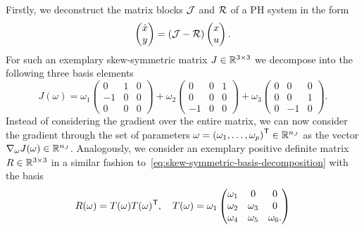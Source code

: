 Firstly, we deconstruct the matrix blocks $\mathcal{J}$ and $\mathcal{R}$ of a \ac{PH} system in the form
\begin{equation*}
    \begin{pmatrix}
        \dot{x} \\
        y
    \end{pmatrix} = (\mathcal{J} - \mathcal{R}) \begin{pmatrix}
        x \\
        u
    \end{pmatrix}.
\end{equation*}
For such an exemplary skew-symmetric matrix $J \in \mathbb{R}^{3 \times 3}$ we decompose into the following three basis elements
\begin{equation}\label{eq:skew-symmetric-basis-decomposition}
    J(\omega) = \omega_1 \begin{pmatrix}
        0 & 1 & 0 \\
        -1 & 0 & 0 \\
        0 & 0 & 0
    \end{pmatrix} + \omega_2 \begin{pmatrix}
        0 & 0 & 1 \\
        0 & 0 & 0 \\
        -1 & 0 & 0
    \end{pmatrix} + \omega_3 \begin{pmatrix}
        0 & 0 & 0 \\
        0 & 0 & 1 \\
        0 & -1 & 0
    \end{pmatrix}.
\end{equation}
Instead of considering the gradient over the entire matrix, we can now consider the gradient through the set of parameters $\omega = {(\omega_1, \dots, \omega_p)}^{\mkern1mu \mathsf{T}} \in \mathbb{R}^{n_J}$ as the vector $\nabla_\omega J(\omega) \in \mathbb{R}^{n_J}$.
Analogously, we consider an exemplary positive definite matrix $R \in \mathbb{R}^{3 \times 3}$ in a similar fashion to~\eqref{eq:skew-symmetric-basis-decomposition} with the basis
\begin{equation}\label{eq:spsd-basis-decomposition}
    R(\omega) = T(\omega) T(\omega)^{\mkern1mu \mathsf{T}},\quad T(\omega) = \omega_1 \begin{pmatrix}
        \omega_1 & 0 & 0 \\
        \omega_2 & \omega_3 & 0 \\
        \omega_4 & \omega_5 & \omega_6.
    \end{pmatrix}
\end{equation}
